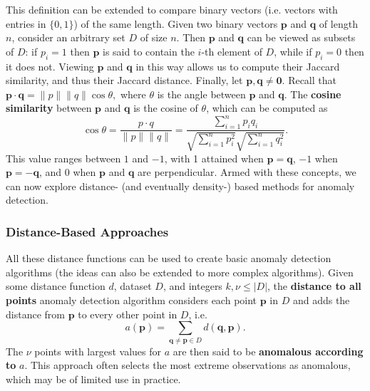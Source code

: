 This definition can be extended to compare binary vectors  (i.e. vectors with entries in $\{0,1\}$) of the same length.
Given two binary vectors $\mathbf{p}$ and $\mathbf{q}$ of length $n$, consider an arbitrary set $D$ of size $n$. Then $\mathbf{p}$ and $\mathbf{q}$ can be viewed as subsets of $D$: if $p_i=1$ then $\mathbf{p}$ is said to contain the $i$-th element of $D$, while if $p_i=0$ then it does not. Viewing $\mathbf{p}$ and $\mathbf{q}$ in this way allows us to compute their Jaccard similarity, and thus their Jaccard distance.\newline\newline
Finally, let $\mathbf{p},\mathbf{q}\neq \mathbf{0}$. Recall that 
$\mathbf{p} \cdot \mathbf{q} 
= \lVert p \rVert \lVert q \rVert \cos\theta,$
where $\theta$ is the angle between $\mathbf{p}$ and $\mathbf{q}$.
The \textbf{cosine similarity} between $\mathbf{p}$ and $\mathbf{q}$ is the cosine of $\theta$, which can be computed as
$$
\cos\theta
= \frac{p \cdot q}{\lVert p \rVert \lVert q \rVert}
= \frac{\sum_{i=1}^n p_i q_i}{\sqrt{\sum_{i=1}^n p_i^2} \sqrt{\sum_{i=1}^n q_i^2}}.
$$
This value ranges between $1$ and $-1$, with 1 attained when $\mathbf{p}=\mathbf{q}$, $-1$ when $\mathbf{p}=-\mathbf{q}$, and $0$ when $\mathbf{p}$ and $\mathbf{q}$ are perpendicular.\newline\newline
Armed with these concepts, we can now explore distance- (and eventually density-) based methods for anomaly detection. 

\subsubsection*{Distance-Based Approaches}

All these distance functions can be used to create basic anomaly detection algorithms (the ideas can also be extended to more complex algorithms).
\newline\newline Given some distance function $d$, dataset $D$, and integers $k,\nu\leq |D|$, 
the \textbf{distance to all points} anomaly detection algorithm considers each point $\mathbf{p}$ in $D$ and adds the distance from $\mathbf{p}$ to every other point in $D$, i.e.
$$
a(\mathbf{p}) 
= \sum_{\mathbf{q}\neq \mathbf{p} \in D} d(\mathbf{q}, \mathbf{p}).
$$
The $\nu$ points with largest values for $a$ are then said to be \textbf{anomalous according to} $a$. This approach often selects the most extreme observations as anomalous, which may be of limited use in practice. 

